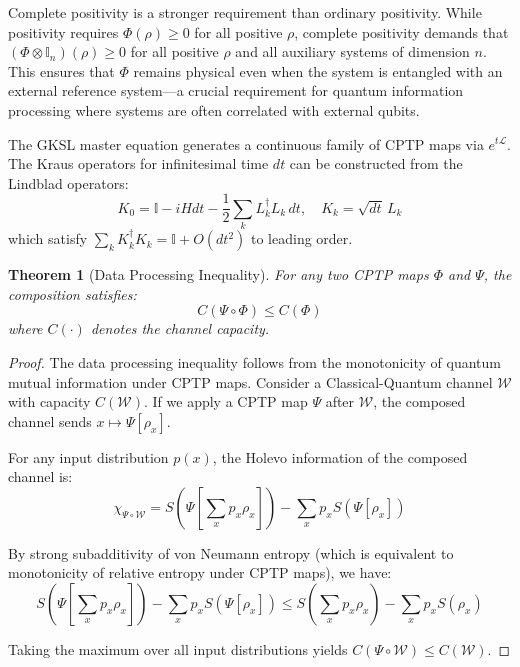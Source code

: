 \documentclass[12pt,a4paper]{article}
\newtheorem{theorem}{Theorem}[section]
\begin{document}
Complete positivity is a stronger requirement than ordinary positivity. While positivity requires $\Phi(\rho) \geq 0$ for all positive $\rho$, complete positivity demands that $(\Phi \otimes \mathbb{I}_n)(\rho) \geq 0$ for all positive $\rho$ and all auxiliary systems of dimension $n$. This ensures that $\Phi$ remains physical even when the system is entangled with an external reference system—a crucial requirement for quantum information processing where systems are often correlated with external qubits.

The GKSL master equation generates a continuous family of CPTP maps via $e^{t\mathcal{L}}$. The Kraus operators for infinitesimal time $dt$ can be constructed from the Lindblad operators:
\begin{equation}
K_0 = \mathbb{I} - i H dt - \frac{1}{2}\sum_k L_k^\dagger L_k \, dt, \quad K_k = \sqrt{dt} \, L_k
\end{equation}
which satisfy $\sum_k K_k^\dagger K_k = \mathbb{I} + O(dt^2)$ to leading order.

\begin{theorem}[Data Processing Inequality]
For any two CPTP maps $\Phi$ and $\Psi$, the composition satisfies:
\begin{equation}
C(\Psi \circ \Phi) \leq C(\Phi)
\end{equation}
where $C(\cdot)$ denotes the channel capacity.
\end{theorem}

\begin{proof}
The data processing inequality follows from the monotonicity of quantum mutual information under CPTP maps. Consider a Classical-Quantum channel $\mathcal{W}$ with capacity $C(\mathcal{W})$. If we apply a CPTP map $\Psi$ after $\mathcal{W}$, the composed channel sends $x \mapsto \Psi[\rho_x]$. 

For any input distribution $p(x)$, the Holevo information of the composed channel is:
\begin{equation}
\chi_{\Psi \circ \mathcal{W}} = S\left(\Psi\left[\sum_x p_x \rho_x\right]\right) - \sum_x p_x S(\Psi[\rho_x])
\end{equation}

By strong subadditivity of von Neumann entropy (which is equivalent to monotonicity of relative entropy under CPTP maps), we have:
\begin{equation}
S\left(\Psi\left[\sum_x p_x \rho_x\right]\right) - \sum_x p_x S(\Psi[\rho_x]) \leq S\left(\sum_x p_x \rho_x\right) - \sum_x p_x S(\rho_x)
\end{equation}

Taking the maximum over all input distributions yields $C(\Psi \circ \mathcal{W}) \leq C(\mathcal{W})$.
\end{proof}
\end{document}
